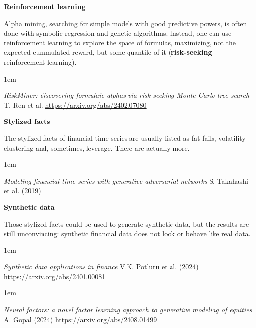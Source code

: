 \documentclass[a5paper]{article}
\let\d\textbf
\newenvironment{reference}{%
  \medskip\goodbreak
  \parskip 0pt
  \raggedright
  \leftskip 1em
  \obeylines
}{\par\medskip\goodbreak}
\def\subsection#1{{\par\bigskip\goodbreak\large\bfseries #1\par}}
\begin{document}
\subsection{Reinforcement learning}

Alpha mining, searching for simple models with good predictive powers,
is often done with symbolic regression and genetic algorithms.
Instead, one can use reinforcement learning to explore the space of formulas,
maximizing, not the expected cummulated reward, but some quantile of it
(\d{risk-seeking} reinforcement learning).

\begin{reference}
  \emph{RiskMiner: discovering formulaic alphas via risk-seeking Monte Carlo tree search}
  T. Ren et al.
  \url{https://arxiv.org/abs/2402.07080}
\end{reference}

\subsection{Stylized facts}

The stylized facts of financial time series are usually listed as
fat fails, volatility clustering and, sometimes, leverage.
There are actually more.

\begin{reference}
  \emph{Modeling financial time series with generative adversarial networks}
  S. Takahashi et al. (2019)
\end{reference}
 
\subsection{Synthetic data}

Those stylized facts could be used to generate synthetic data,
but the results are still unconvincing:
synthetic financial data does not look or behave like real data.

\begin{reference}
  \emph{Synthetic data applications in finance}
  V.K. Potluru et al. (2024)
  \url{https://arxiv.org/abs/2401.00081}
\end{reference}

\begin{reference}
  \emph{Neural factors: a novel factor learning approach to generative modeling of equities}
  A. Gopal (2024)
  \url{https://arxiv.org/abs/2408.01499}
\end{reference}
\end{document}
